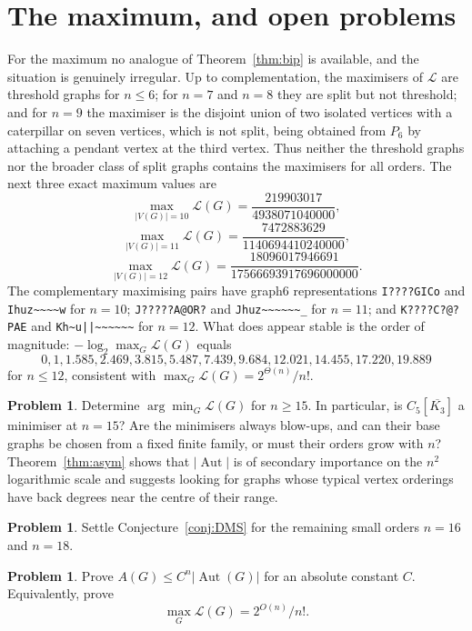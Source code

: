 \documentclass[11pt]{article}
\theoremstyle{definition}
\newtheorem{problem}[theorem]{Problem}
\DeclareMathOperator{\Aut}{Aut}
\newcommand{\Lk}{\mathcal{L}}
\begin{document}
\section{The maximum, and open problems}\label{sec:remarks}

For the maximum no analogue of Theorem~\ref{thm:bip} is available, and the situation is genuinely irregular. Up to complementation, the maximisers of $\Lk$ are threshold graphs for $n\le 6$; for $n=7$ and $n=8$ they are split but not threshold; and for $n=9$ the maximiser is the disjoint union of two isolated vertices with a caterpillar on seven vertices, which is not split, being obtained from $P_6$ by attaching a pendant vertex at the third vertex. Thus neither the threshold graphs nor the broader class of split graphs contains the maximisers for all orders. The next three exact maximum values are
\[
\max_{\lvert V(G)\rvert=10}\Lk(G)=\frac{219903017}{4938071040000},
\]
\[
\max_{\lvert V(G)\rvert=11}\Lk(G)=\frac{7472883629}{1140694410240000},
\]
\[
\max_{\lvert V(G)\rvert=12}\Lk(G)=\frac{18096017946691}{17566693917696000000}.
\]
The complementary maximising pairs have graph6 representations
\verb|I????GICo| and \verb|Ihuz~~~~w| for $n=10$;
\verb|J?????A@OR?| and \verb|Jhuz~~~~~~_| for $n=11$; and
\verb+K????C?@?PAE+ and \verb+Kh~u||~~~~~~+ for $n=12$.
What does appear stable is the order of magnitude: $-\log_2\max_G\Lk(G)$ equals
\[
0,1,1.585,2.469,3.815,5.487,7.439,9.684,12.021,14.455,17.220,19.889
\]
for $n\le 12$, consistent with $\max_G\Lk(G)=2^{\Theta(n)}/n!$.

\begin{problem}\label{prob:min}
Determine $\arg\min_G\Lk(G)$ for $n\ge15$. In particular, is
$C_5[\overline{K_3}]$ a minimiser at $n=15$? Are the minimisers always
blow-ups, and can their base graphs be chosen from a fixed finite family, or
must their orders grow with $n$? Theorem~\ref{thm:asym} shows that
$\lvert\Aut\rvert$ is of secondary importance on the $n^2$ logarithmic scale
and suggests looking for graphs whose typical vertex orderings have back
degrees near the centre of their range.
\end{problem}

\begin{problem}
Settle Conjecture~\ref{conj:DMS} for the remaining small orders $n=16$ and
$n=18$.
\end{problem}

\begin{problem}
Prove $A(G)\le C^n\lvert\Aut(G)\rvert$ for an absolute constant $C$. Equivalently,
prove
\[
\max_G\Lk(G)=2^{O(n)}/n!.
\]
\end{problem}
\end{document}
